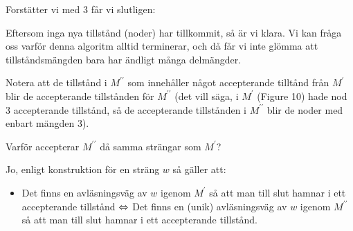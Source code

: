 \newpage
\noindent Forstätter vi med $3$ får vi slutligen:
\begin{figure}[ht]
    \centering
    \caption{}
\end{figure}
\par\bigskip
\noindent Eftersom inga nya tillstånd (noder) har tillkommit, så är vi klara. Vi kan fråga oss varför denna algoritm alltid terminerar, och då får vi inte glömma att tillståndsmängden bara har ändligt många delmängder.\par\bigskip
\noindent Notera att de tillstånd i $M^{\prime\prime}$ som innehåller något accepterande tilltånd från $M^{\prime}$ blir de accepterande tillstånden för $M^{\prime\prime}$ (det vill säga, i $M^{\prime}$ (Figure 10) hade nod 3 accepterande tillstånd, så de accepterande tillstånden i $M^{\prime\prime}$ blir de noder med enbart mängden 3).
\par\bigskip
\noindent Varför accepterar $M^{\prime\prime}$ då samma strängar som $M^{\prime}$?\par
\noindent Jo, enligt konstruktion för en sträng $w$ så gäller att:
\begin{itemize}
  \item Det finns en avläsningsväg av $w$ igenom $M^{\prime}$ så att man till slut hamnar i ett accepterande tillstånd $\Leftrightarrow$ Det finns en (unik) avläsningsväg av $w$ igenom $M^{\prime\prime}$ så att man till slut hamnar i ett accepterande tillstånd.
\end{itemize}
